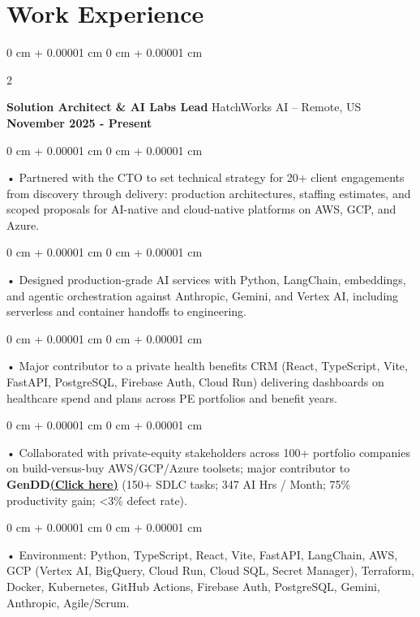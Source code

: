 \documentclass[10pt, letterpaper]{article}
\newenvironment{onecolentry}{
    \begin{adjustwidth}{
        0 cm + 0.00001 cm
    }{
        0 cm + 0.00001 cm
    }
}{
    \end{adjustwidth}
} %
\newenvironment{twocolentry}[2][]{
    \onecolentry
    \def\secondColumn{#2}
    \setcolumnwidth{\fill, 4.5 cm}
    \begin{paracol}{2}
}{
    \switchcolumn \raggedleft \secondColumn
    \end{paracol}
    \endonecolentry
} %
\begin{document}
    \vspace{0.1cm}
    \section{Work Experience}
        \vspace{0.1cm}

        \begin{twocolentry}{
            \textbf{November 2025 - Present}
        }
            \textbf{Solution Architect \& AI Labs Lead} HatchWorks AI -- Remote, US\end{twocolentry}

        \begin{onecolentry}
             • Partnered with the CTO to set technical strategy for 20+ client engagements from discovery through delivery: production architectures, staffing estimates, and scoped proposals for AI-native and cloud-native platforms on AWS, GCP, and Azure.
        \end{onecolentry}
        \begin{onecolentry}
             • Designed production-grade AI services with Python, LangChain, embeddings, and agentic orchestration against Anthropic, Gemini, and Vertex AI, including serverless and container handoffs to engineering.
        \end{onecolentry}
        \begin{onecolentry}
             • Major contributor to a private health benefits CRM (React, TypeScript, Vite, FastAPI, PostgreSQL, Firebase Auth, Cloud Run) delivering dashboards on healthcare spend and plans across PE portfolios and benefit years.
        \end{onecolentry}
        \begin{onecolentry}
             • Collaborated with private-equity stakeholders across 100+ portfolio companies on build-versus-buy AWS/GCP/Azure toolsets; major contributor to \textbf{GenDD}\href{https://hatchworks.com/generative-driven-development/}{\textbf{(Click here)}} (150+ SDLC tasks; 347 AI Hrs / Month; 75\% productivity gain; <3\% defect rate).
        \end{onecolentry}
        \begin{onecolentry}
             • Environment: Python, TypeScript, React, Vite, FastAPI, LangChain, AWS, GCP (Vertex AI, BigQuery, Cloud Run, Cloud SQL, Secret Manager), Terraform, Docker, Kubernetes, GitHub Actions, Firebase Auth, PostgreSQL, Gemini, Anthropic, Agile/Scrum.
        \end{onecolentry}
\end{document}
